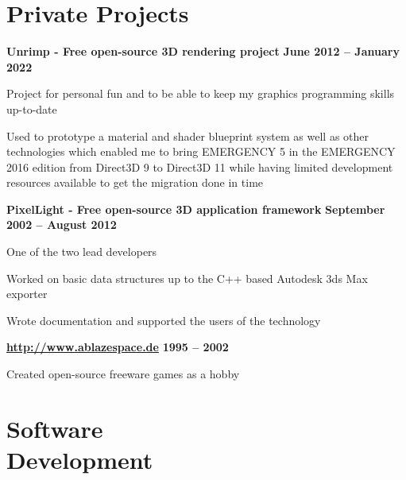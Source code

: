 \documentclass[margin,line]{Ofenberg_Resume}
\begin{document}
\begin{resume}
	\section{\mysidestyle Private \linebreak Projects}
	\textbf{Unrimp - Free open-source 3D rendering project} \hfill \textbf{June 2012 -- January 2022}\vspace{-3mm}\\\vspace{-1mm}%
	\begin{list2}
		\item Project for personal fun and to be able to keep my graphics programming skills up-to-date
		\item Used to prototype a material and shader blueprint system as well as other technologies which enabled me to bring EMERGENCY 5 in the EMERGENCY 2016 edition from Direct3D 9 to Direct3D 11 while having limited development resources available to get the migration done in time
	\end{list2}\vspace{-1.5mm}
	\textbf{PixelLight - Free open-source 3D application framework} \hfill \textbf{September 2002 -- August 2012}\vspace{-3mm}\\\vspace{-1mm}%
	\begin{list2}
		\item One of the two lead developers
		\item Worked on basic data structures up to the C++ based Autodesk 3ds Max exporter
		\item Wrote documentation and supported the users of the technology
	\end{list2}\vspace{-1.5mm}
	\textbf{\url{http://www.ablazespace.de}} \hfill \textbf{1995 -- 2002}\vspace{-3mm}\\\vspace{-1mm}%
	\begin{list2}
		\item Created open-source freeware games as a hobby
	\end{list2}\vspace{-1.5mm}
\pagebreak


	\section{\mysidestyle Software\\Development}


\end{resume}
\end{document}

